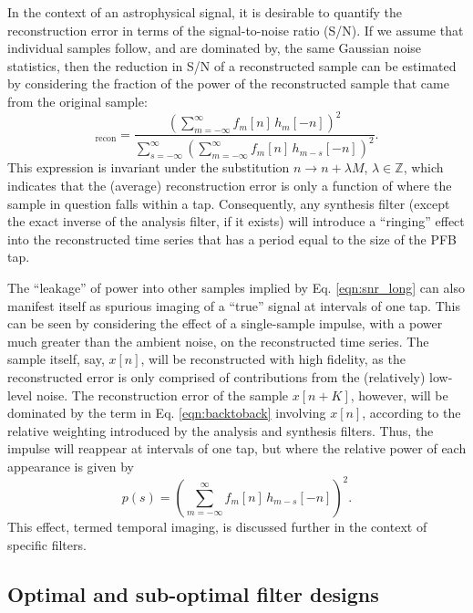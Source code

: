 \documentclass{pasa}%
\begin{document}
In the context of an astrophysical signal, it is desirable to quantify the reconstruction error in terms of the signal-to-noise ratio (S/N).
If we assume that individual samples follow, and are dominated by, the same Gaussian noise statistics, then the reduction in S/N of a reconstructed sample can be estimated by considering the fraction of the power of the reconstructed sample that came from the original sample:
\begin{equation}
    [\text{S/N}]_\text{recon}
      = \frac{\left(\sum\limits_{m = -\infty}^{\infty} f_m[n]\,h_m[-n]\right)^2}{
            \sum\limits_{s = -\infty}^{\infty}
            \left(\sum\limits_{m = -\infty}^{\infty} f_m[n]\,h_{m-s}[-n]\right)^2
        }.
    \label{eqn:snr_long}
\end{equation}
This expression is invariant under the substitution $n \rightarrow n + \lambda M$, $\lambda \in \mathbb{Z}$, which indicates that the (average) reconstruction error is only a function of where the sample in question falls within a tap.
Consequently, any synthesis filter (except the exact inverse of the analysis filter, if it exists) will introduce a ``ringing'' effect into the reconstructed time series that has a period equal to the size of the PFB tap.

The ``leakage'' of power into other samples implied by Eq. \eqref{eqn:snr_long} can also manifest itself as spurious imaging of a ``true'' signal at intervals of one tap.
This can be seen by considering the effect of a single-sample impulse, with a power much greater than the ambient noise, on the reconstructed time series.
The sample itself, say, $x[n]$, will be reconstructed with high fidelity, as the reconstructed error is only comprised of contributions from the (relatively) low-level noise.
The reconstruction error of the sample $x[n+K]$, however, will be dominated by the term in Eq. \eqref{eqn:backtoback} involving $x[n]$, according to the relative weighting introduced by the analysis and synthesis filters.
Thus, the impulse will reappear at intervals of one tap, but where the relative power of each appearance is given by
\begin{equation}
    p(s) = \left(\sum\limits_{m = -\infty}^{\infty} f_m[n]\,h_{m-s}[-n]\right)^2.
    \label{eqn:ringing}
\end{equation}
This effect, termed temporal imaging, is discussed further in the context of specific filters.

\subsection{Optimal and sub-optimal filter designs}
\end{document}
